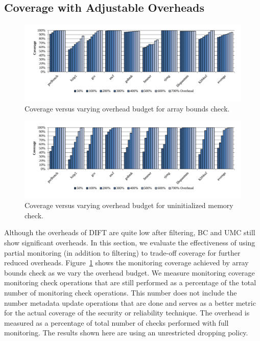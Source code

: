 \subsection{Coverage with Adjustable Overheads}

\begin{figure}
  \begin{center}
    \includegraphics[width=\linewidth]{figs/data_bc_sweep.pdf}
    \vspace{-0.4in}
    \caption{Coverage versus varying overhead budget for array bounds check.}
    \label{fig:evaluation.bc_sweep}
    \vspace{-0.2in}
  \end{center}
\end{figure}

\begin{figure}
  \begin{center}
    \includegraphics[width=\linewidth]{figs/data_umc_sweep.pdf}
    \vspace{-0.4in}
    \caption{Coverage versus varying overhead budget for uninitialized memory check.}
    \label{fig:evaluation.umc_sweep}
    \vspace{-0.1in}
  \end{center}
\end{figure}

Although the overheads of DIFT are quite low after filtering, BC and UMC still
show significant overheads. In this section, we evaluate the effectiveness of
using partial monitoring (in addition to filtering) to trade-off coverage for further reduced overheads.
Figure~\ref{fig:evaluation.bc_sweep} shows the monitoring coverage achieved by
array bounds check as we vary the overhead budget. We measure monitoring
coverage monitoring check operations that are still performed as a percentage
of the total number of monitoring check operations. This number does not
include the number metadata update operations that are done and serves as a
better metric for the actual coverage of the security or reliability technique.
The overhead is measured as a percentage of total number of checks performed
with full monitoring. The results shown here are using an unrestricted dropping
policy.

